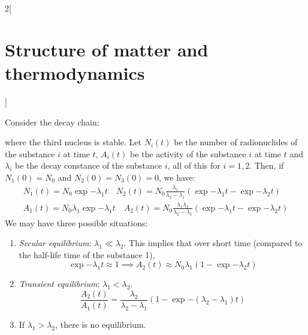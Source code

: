 \documentclass[../../../main.tex]{subfiles}
\begin{document}
\begin{multicols}{2}[\section{Structure of matter and thermodynamics}]
\begin{definition}
    \end{definition}
    \begin{center}
        \begin{minipage}{\linewidth}
            \centering
            
        \end{minipage}
    \end{center}
    \begin{prop}
        Consider the decay chain:
        \begin{center}
            \begin{minipage}{\linewidth}
                \centering
                
            \end{minipage}
        \end{center}
        where the third nucleus is stable.
        Let $N_i(t)$ be the number of radionuclides of the substance $i$ at time $t$, $A_i(t)$ be the activity of the substance $i$ at time $t$ and $\lambda_i$ be the decay constance of the substance $i$, all of this for $i=1,2$. Then, if $N_1(0)=N_0$ and $N_2(0)=N_3(0)=0$, we have:
        \begin{gather*}
            N_1(t)=N_0\exp{-\lambda_1t}\quad N_2(t) =N_0\frac{\lambda_1}{\lambda_2-\lambda_1}\left(\exp{-\lambda_1t}-\exp{-\lambda_2t}\right)         \\
            A_1(t)=N_0\lambda_1\exp{-\lambda_1t}\quad A_2(t)=N_0\frac{\lambda_1\lambda_2}{\lambda_2-\lambda_1}\left(\exp{-\lambda_1t}-\exp{-\lambda_2t}\right)
        \end{gather*}
        We may have three possible situations:
        \begin{enumerate}
            \item \textit{Secular equilibrium}: $\lambda_1\ll\lambda_2$. This implies that over short time (compared to the half-life time of the substance 1), $$\exp{-\lambda_1 t}\approx 1\implies A_2(t)\approx N_0\lambda_1(1-\exp{-\lambda_2t})$$
            \item \textit{Transient equilibrium}: $\lambda_1<\lambda_2$.
                  $$\frac{A_2(t)}{A_1(t)}=\frac{\lambda_2}{\lambda_2-\lambda_1}\left(1-\exp{-(\lambda_2-\lambda_1)t}\right)$$
            \item If $\lambda_1>\lambda_2$, there is no equilibrium.

\end{enumerate}
\end{prop}
\end{multicols}
\end{document}
